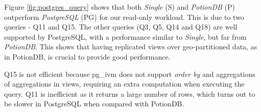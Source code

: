 \documentclass[sigplan,twocolumn,review,anonymous]{acmart}
\begin{document}

Figure \ref{fig:postgres_query} shows that
both \textit{Single} (S) and \textit{PotionDB} (P) outperform \textit{PostgreSQL} (PG) for our read-only workload.
This is due to two queries - Q11 and Q15.
The other queries (Q3, Q5, Q14 and Q18) are well supported by PostgreSQL, with a performance similar to \textit{Single}, 
but far from \textit{PotionDB}. 
This shows that having replicated views over geo-partitioned data, as in PotionDB, is crucial to provide good performance.

Q15 is not efficient because pg\_ivm does not support \emph{order by} and aggregations of aggregations in views, requiring 
an extra computation when executing the query. Q11 is inefficient as it returns a large number of rows, which
turns out to be slower in PostgreSQL when compared with PotionDB.

%
\end{document}
